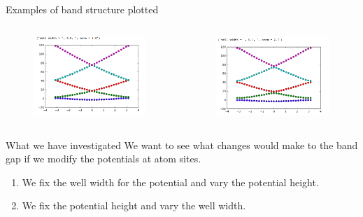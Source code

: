 \documentclass{beamer}
\begin{document}
\begin{frame}{Examples of band structure plotted}
\begin{columns}[c] %

\begin{figure}
\includegraphics[width=0.8\linewidth]{bandstructure1.png}
\end{figure}

\begin{figure}
\includegraphics[width=0.8\linewidth]{bandstructure2.png}
\end{figure}

\end{columns}

\end{frame}
\begin{frame}{What we have investigated}
We want to see what changes would make to the band gap if we modify the potentials at atom sites. 
\begin{enumerate}
    \item We fix the well width for the potential and vary the potential height. 
    \item We fix the potential height and vary the well width. 
\end{enumerate}

\end{frame}
\end{document}
